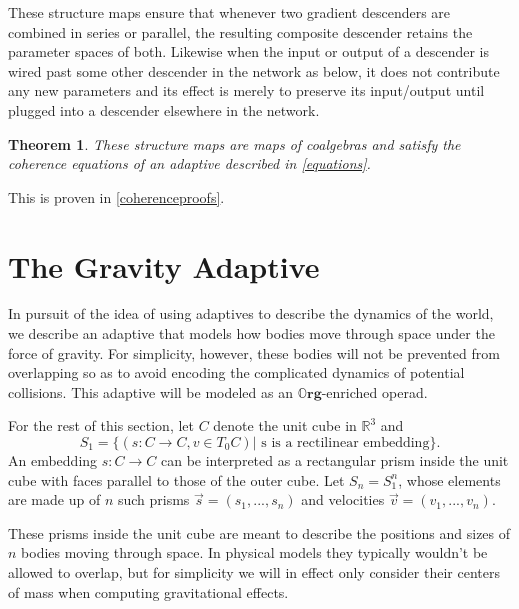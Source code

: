 \documentclass[11pt, one side, article]{memoir}
\theoremstyle{definition}
\theoremstyle{plain}
\newtheorem{theorem}[definitionx]{Theorem}
\newenvironment{definition}
  {\pushQED{\qed}\renewcommand{\qedsymbol}{$\lozenge$}\definitionx}
  {\popQED\enddefinitionx}
\newcommand{\Cat}[1]{\mathbf{#1}}%
\newcommand{\rr}{\mathbb{R}}
\newcommand{\0}{\textsf{0}}
\newcommand{\1}{\tn{\textsf{1}}}
\newcommand{\org}{{\mathbb{O}\Cat{rg}}}
\begin{document}
These structure maps ensure that whenever two gradient descenders are combined in series or parallel, the resulting composite descender retains the parameter spaces of both. Likewise when the input or output of a descender is wired past some other descender in the network as below, %
it does not contribute any new parameters and its effect is merely to preserve its input/output until plugged into a descender elsewhere in the network.


\begin{theorem}\label{gradientadaptive}
These structure maps are maps of coalgebras and satisfy the coherence equations of an adaptive described in \cref{equations}.
\end{theorem}

This is proven in \cref{coherenceproofs}.




\section{The Gravity Adaptive}


In pursuit of the idea of using adaptives to describe the dynamics of the world, we describe an adaptive that models how bodies move through space under the force of gravity. For simplicity, however, these bodies will not be prevented from overlapping so as to avoid encoding the complicated dynamics of potential collisions. This adaptive will be modeled as an $\org$-enriched operad. %

\begin{definition}
For the rest of this section, let $C$ denote the unit cube in $\rr^3$ and
$$S_1 = \{(s : C \to C, v \in T_0 C) | \textrm{ s is a rectilinear embedding}\}.$$ 
An embedding $s : C \to C$ can be interpreted as a rectangular prism inside the unit cube with faces parallel to those of the outer cube. Let $S_n = S_1^n$, whose elements are made up of $n$ such prisms $\vec s = (s_1,...,s_n)$ and velocities $\vec v = (v_1,...,v_n)$.
\end{definition}

These prisms inside the unit cube are meant to describe the positions and sizes of $n$ bodies moving through space. In physical models they typically wouldn't be allowed to overlap, but for simplicity we will in effect only consider their centers of mass when computing gravitational effects. %
\end{document}
